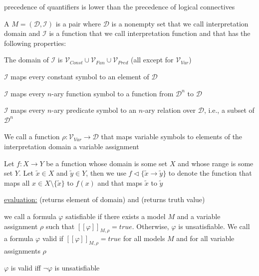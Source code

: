 \documentclass[landscape, a4paper]{article}
\begin{document}
\begin{minipage}[t]{0.2\linewidth}
\begin{betterlist}
\begin{betterlist}
			\item \alert{precedence} of quantifiers is lower than the precedence of logical connectives
			\item A  $M = (\mathcal{D}, \mathcal{I})$ is a pair where $\mathcal{D}$ is a nonempty set that we call \alert{interpretation domain} and $\mathcal{I}$ is a function that we call \alert{interpretation function} and that has the following properties:
			\begin{betterlist}
				\item The domain of $\mathcal{I}$ is $\mathcal{V}_{Const} \cup \mathcal{V}_{Fun} \cup \mathcal{V}_{Pred}$ (all \alert{except for $\mathcal{V}_{Var}$})
				\item $\mathcal{I}$ maps every constant symbol to an element of $\mathcal{D}$
				\item $\mathcal{I}$ maps every $n$-ary function symbol to a function from $\mathcal{D}^n$ to $\mathcal{D}$
				\item $\mathcal{I}$ maps every $n$-ary predicate symbol to an $n$-ary relation over $\mathcal{D}$, i.e., a subset of $\mathcal{D}^n$
			\end{betterlist}
			We call a function $\rho : \mathcal{V}_{Var} \rightarrow \mathcal{D}$ that maps variable symbols to elements of the interpretation domain a \alert{variable assignment}
			\item Let $f : X \rightarrow Y$ be a function whose domain is some set $X$ and whose range is some set $Y$. Let $\tilde x \in X$ and $\tilde y \in Y$, then we use $f \triangleleft \{\tilde x \rightarrow \tilde y\}$ to denote the function that maps all $x \in X\setminus \{\tilde x\}$  to $f (x)$ and that maps $\tilde x$ to $\tilde y$
			\item \underline{evaluation:}  (returns \alert{element of domain}) and  (returns \alert{truth value})
		\end{betterlist}
		\item we call a formula $\varphi$ \alert{satisfiable} if there exists a model $M$ and a variable assignment $\rho$ such that $[[\varphi]]_{M,\rho} = true$. Otherwise, $\varphi$ is \alert{unsatisfiable}. We call a formula $\varphi$ \alert{valid} if $[[\varphi]]_{M,\rho} = true$ for all models $M$ and for all variable assignments $\rho$
		\begin{betterlist}
			\item $\varphi$ is valid iff $\neg \varphi$ is unsatisfiable
		\end{betterlist}

\end{betterlist}
\end{minipage}
\end{document}
